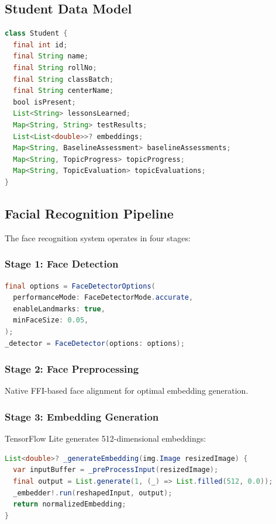 \documentclass[12pt,a4paper]{article}
\begin{document}
\subsection{Student Data Model}
\begin{lstlisting}[language=Java, caption=Student Data Structure]
class Student {
  final int id;
  final String name;
  final String rollNo;
  final String classBatch;
  final String centerName;
  bool isPresent;
  List<String> lessonsLearned;
  Map<String, String> testResults;
  List<List<double>>? embeddings;
  Map<String, BaselineAssessment> baselineAssessments;
  Map<String, TopicProgress> topicProgress;
  Map<String, TopicEvaluation> topicEvaluations;
}
\end{lstlisting}

\subsection{Facial Recognition Pipeline}
The face recognition system operates in four stages:

\subsubsection{Stage 1: Face Detection}
\begin{lstlisting}[language=Java, caption=Face Detection Implementation]
final options = FaceDetectorOptions(
  performanceMode: FaceDetectorMode.accurate,
  enableLandmarks: true,
  minFaceSize: 0.05,
);
_detector = FaceDetector(options: options);
\end{lstlisting}

\subsubsection{Stage 2: Face Preprocessing}
Native FFI-based face alignment for optimal embedding generation.

\subsubsection{Stage 3: Embedding Generation}
TensorFlow Lite generates 512-dimensional embeddings:
\begin{lstlisting}[language=Java, caption=Embedding Generation]
List<double>? _generateEmbedding(img.Image resizedImage) {
  var inputBuffer = _preProcessInput(resizedImage);
  final output = List.generate(1, (_) => List.filled(512, 0.0));
  _embedder!.run(reshapedInput, output);
  return normalizedEmbedding;
}
\end{lstlisting}
\end{document}
